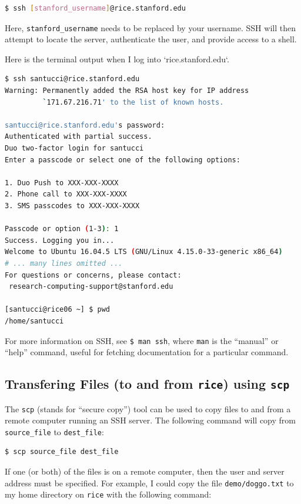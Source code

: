 \documentclass[12pt,letterpaper,twoside]{article}
\begin{document}
\begin{lstlisting}[language=bash]
$ ssh [stanford_username]@rice.stanford.edu
\end{lstlisting}

Here, \texttt{stanford\_username} needs to be replaced by your username.  SSH will
then attempt to locate the server, authenticate the user, and provide access
to a shell.

Here is the terminal output when I log into `rice.stanford.edu`.

{
  \footnotesize
\begin{lstlisting}[language=bash]
$ ssh santucci@rice.stanford.edu
Warning: Permanently added the RSA host key for IP address
         `171.67.216.71' to the list of known hosts.

santucci@rice.stanford.edu's password:
Authenticated with partial success.
Duo two-factor login for santucci
Enter a passcode or select one of the following options:

1. Duo Push to XXX-XXX-XXXX
2. Phone call to XXX-XXX-XXXX
3. SMS passcodes to XXX-XXX-XXXX

Passcode or option (1-3): 1
Success. Logging you in...
Welcome to Ubuntu 16.04.5 LTS (GNU/Linux 4.15.0-33-generic x86_64)
# ... many lines omitted ...
For questions or concerns, please contact:
 research-computing-support@stanford.edu

[santucci@rice06 ~] $ pwd
/home/santucci
\end{lstlisting}
}

For more information on SSH, see \texttt{\$ man ssh}, where \texttt{man} is the ``manual'' or ``help'' 
command, useful for fetching documentation for a particular command.

\subsection{Transfering Files (to and from \texttt{rice}) using \texttt{scp}}

The \texttt{scp} (stands for ``secure copy'') tool can be used to copy files to and from
a remote computer running an SSH server.  The following command will copy from
\texttt{source\_file} to \texttt{dest\_file}:

\begin{lstlisting}[language=bash]
$ scp source_file dest_file
\end{lstlisting}

If one (or both) of the files is on a remote computer, then the user and server
address must be specified.  For example, I could copy the file \texttt{demo/doggo.txt}
to my home directory on \texttt{rice} with the following command:
\end{document}
